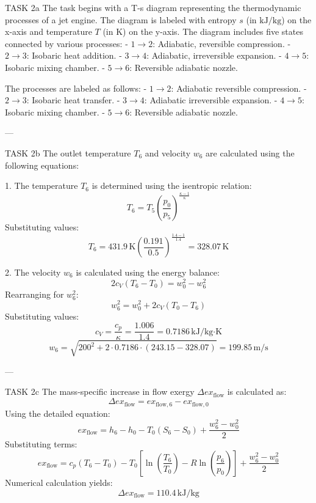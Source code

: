 TASK 2a  
The task begins with a T-s diagram representing the thermodynamic processes of a jet engine. The diagram is labeled with entropy \( s \) (in \( \text{kJ/kg} \)) on the x-axis and temperature \( T \) (in \( \text{K} \)) on the y-axis. The diagram includes five states connected by various processes:  
- \( 1 \to 2 \): Adiabatic, reversible compression.  
- \( 2 \to 3 \): Isobaric heat addition.  
- \( 3 \to 4 \): Adiabatic, irreversible expansion.  
- \( 4 \to 5 \): Isobaric mixing chamber.  
- \( 5 \to 6 \): Reversible adiabatic nozzle.  

The processes are labeled as follows:  
- \( 1 \to 2 \): Adiabatic reversible compression.  
- \( 2 \to 3 \): Isobaric heat transfer.  
- \( 3 \to 4 \): Adiabatic irreversible expansion.  
- \( 4 \to 5 \): Isobaric mixing chamber.  
- \( 5 \to 6 \): Reversible adiabatic nozzle.  

---

TASK 2b  
The outlet temperature \( T_6 \) and velocity \( w_6 \) are calculated using the following equations:  

1. The temperature \( T_6 \) is determined using the isentropic relation:  
\[
T_6 = T_5 \left( \frac{p_0}{p_5} \right)^{\frac{\kappa - 1}{\kappa}}
\]  
Substituting values:  
\[
T_6 = 431.9 \, \text{K} \left( \frac{0.191}{0.5} \right)^{\frac{1.4 - 1}{1.4}} = 328.07 \, \text{K}
\]

2. The velocity \( w_6 \) is calculated using the energy balance:  
\[
2c_V(T_6 - T_0) = w_0^2 - w_6^2
\]  
Rearranging for \( w_6^2 \):  
\[
w_6^2 = w_0^2 + 2c_V(T_0 - T_6)
\]  
Substituting values:  
\[
c_V = \frac{c_p}{\kappa} = \frac{1.006}{1.4} = 0.7186 \, \text{kJ/kg·K}
\]  
\[
w_6 = \sqrt{200^2 + 2 \cdot 0.7186 \cdot (243.15 - 328.07)} = 199.85 \, \text{m/s}
\]

---

TASK 2c  
The mass-specific increase in flow exergy \( \Delta ex_{\text{flow}} \) is calculated as:  
\[
\Delta ex_{\text{flow}} = ex_{\text{flow},6} - ex_{\text{flow},0}
\]  
Using the detailed equation:  
\[
ex_{\text{flow}} = h_6 - h_0 - T_0(S_6 - S_0) + \frac{w_6^2 - w_0^2}{2}
\]  
Substituting terms:  
\[
ex_{\text{flow}} = c_p(T_6 - T_0) - T_0 \left[ \ln\left(\frac{T_6}{T_0}\right) - R \ln\left(\frac{p_6}{p_0}\right) \right] + \frac{w_6^2 - w_0^2}{2}
\]  
Numerical calculation yields:  
\[
\Delta ex_{\text{flow}} = 110.4 \, \text{kJ/kg}
\]